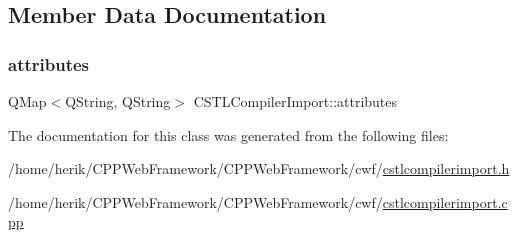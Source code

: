 \subsection{Member Data Documentation}
\mbox{\label{class_c_s_t_l_compiler_import_a7a5f0f43548ad8f6dd24e3d8f2b5a19c}} 
\subsubsection{\texorpdfstring{attributes}{attributes}}
{\footnotesize\ttfamily Q\+Map$<$Q\+String, Q\+String$>$ C\+S\+T\+L\+Compiler\+Import\+::attributes}



The documentation for this class was generated from the following files\+:\begin{DoxyCompactItemize}
\item 
/home/herik/\+C\+P\+P\+Web\+Framework/\+C\+P\+P\+Web\+Framework/cwf/\hyperlink{cstlcompilerimport_8h}{cstlcompilerimport.\+h}\item 
/home/herik/\+C\+P\+P\+Web\+Framework/\+C\+P\+P\+Web\+Framework/cwf/\hyperlink{cstlcompilerimport_8cpp}{cstlcompilerimport.\+cpp}\end{DoxyCompactItemize}

